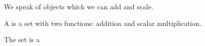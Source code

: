 
\sbasic


\sstart



We speak of objects
which we can add
and scale.


A  is a set
with two functions:
addition and scalar
multiplication.

The set is a


\strats

